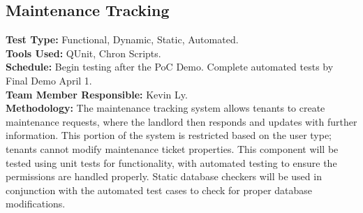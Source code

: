 \documentclass[12pt]{article}
\begin{document}
\subsection{Maintenance Tracking}
\textbf{Test Type:} Functional, Dynamic, Static, Automated. \\
\textbf{Tools Used:} QUnit, Chron Scripts. \\
\textbf{Schedule:} Begin testing after the PoC Demo. Complete automated tests by Final Demo April 1. \\
\textbf{Team Member Responsible:} Kevin Ly. \\
\textbf{Methodology:} The maintenance tracking system allows tenants to create maintenance requests, where the landlord then responds and updates with further information. This portion of the system is restricted based on the user type; tenants cannot modify maintenance ticket properties. This component will be tested using unit tests for functionality, with automated testing to ensure the permissions are handled properly. Static database checkers will be used in conjunction with the automated test cases to check for proper database modifications.
\end{document}
